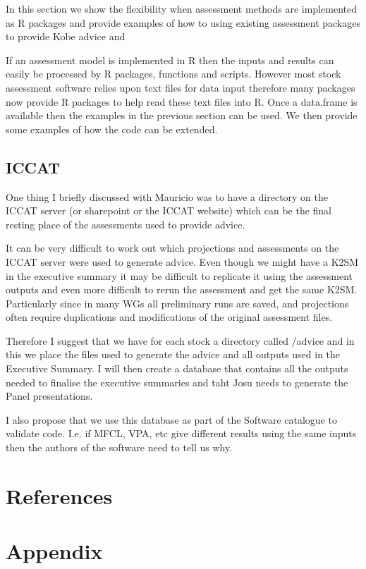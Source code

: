 In this section we show the flexibility when assessment methods are implemented as R packages and provide examples of how to using existing assessment packages 
to provide Kobe advice and 

If an assessment model is implemented in R then the inputs and results can easily be processed by R packages, functions and scripts. However most stock assessment 
software relies upon text files for data input therefore many packages now provide R packages to help read these text files into R. Once a data.frame is
available then the examples in the previous section can be used. We then provide some examples of how the code can be extended. 


\subsection{ICCAT}

One thing I briefly discussed with Mauricio was to have a directory on the ICCAT server (or sharepoint or the ICCAT website) which can be the final resting place of the assessments used to provide advice.

It can be very difficult to work out which projections and assessments on the ICCAT server were used to generate advice.  Even though we might have a K2SM in the executive summary it may be difficult to replicate it using the assessment outputs and even more difficult to rerun the assessment and get the same K2SM. Particularly since in many WGs all preliminary runs are saved, and projections often require duplications and modifications of the original assessment files.

Therefore I suggest that we have for each stock a directory called \slash advice and in this we place the files used to generate the advice and all outputs used in the Executive Summary. I will then create a database that contains all the outputs needed to finalise the executive summaries and taht Josu needs to generate the Panel presentations.

I also propose that we use this database as part of the Software catalogue to validate code. I.e. if MFCL, VPA, etc give different results using the same inputs then the authors of the software need to tell us why.


\section{References}

  
\section{Appendix}

